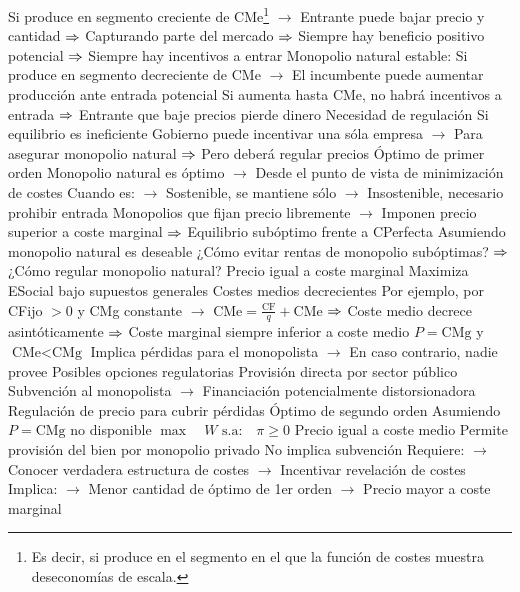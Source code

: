 \documentclass{nuevotema}
\begin{document}
\begin{esquemal}
				\4[] Si produce en segmento creciente de CMe\footnote{Es decir, si produce en el segmento en el que la función de costes muestra deseconomías de escala.}
				\4[] $\to$ Entrante puede bajar precio y cantidad
				\4[] $\Rightarrow$ Capturando parte del mercado
				\4[] $\Rightarrow$ Siempre hay beneficio positivo potencial
				\4[] $\Rightarrow$ Siempre hay incentivos a entrar
				\4 Monopolio natural estable:
				\4[] Si produce en segmento decreciente de CMe
				\4[] $\to$ El incumbente puede aumentar producción ante entrada potencial
				\4[] Si aumenta hasta CMe, no habrá incentivos a entrada
				\4[] $\Rightarrow$ Entrante que baje precios pierde dinero
				\4 Necesidad de regulación
				\4[] Si equilibrio es ineficiente
				\4[] Gobierno puede incentivar una sóla empresa
				\4[] $\to$ Para asegurar monopolio natural
				\4[] $\Rightarrow$ Pero deberá regular precios
			\3 Óptimo de primer orden
				\4 Monopolio natural es óptimo
				\4[] $\to$ Desde el punto de vista de minimización de costes
				\4[] Cuando es:
				\4[] $\to$ Sostenible, se mantiene sólo
				\4[] $\to$ Insostenible, necesario prohibir entrada
				\4 Monopolios que fijan precio libremente
				\4[] $\to$ Imponen precio superior a coste marginal
				\4[] $\Rightarrow$ Equilibrio subóptimo frente a CPerfecta
				\4 Asumiendo monopolio natural es deseable
				\4[] ¿Cómo evitar rentas de monopolio subóptimas?
				\4[] $\Rightarrow$ ¿Cómo regular monopolio natural?
				\4 Precio igual a coste marginal
				\4[] Maximiza ESocial bajo supuestos generales
				\4 Costes medios decrecientes
				\4[] Por ejemplo, por CFijo $>0$ y CMg constante
				\4[] $\to$ $\text{CMe} = \frac{\text{CF}}{q} + \text{CMe}$
				\4[] $\Rightarrow$ Coste medio decrece asintóticamente
				\4[] $\Rightarrow$ Coste marginal siempre inferior a coste medio
				\4 $P=\text{CMg}$ y $\text{CMe} < \text{CMg}$
				\4[] Implica pérdidas para el monopolista
				\4[] $\to$ En caso contrario, nadie provee
				\4 Posibles opciones regulatorias
				\4[] Provisión directa por sector público
				\4[] Subvención al monopolista
				\4[] $\to$ Financiación potencialmente distorsionadora
				\4[] Regulación de precio para cubrir pérdidas
			\3 Óptimo de segundo orden
				\4 Asumiendo $P=\text{CMg}$ no disponible
				\4[] $\max \quad W$
				\4[] $\text{s.a:} \quad \pi \geq 0$
				\4 Precio igual a coste medio
				\4[] Permite provisión del bien por monopolio privado
				\4[] No implica subvención
				\4[] Requiere:
				\4[] $\to$ Conocer verdadera estructura de costes
				\4[] $\to$ Incentivar revelación de costes
				\4[] Implica:
				\4[] $\to$ Menor cantidad de óptimo de 1er orden
				\4[] $\to$ Precio mayor a coste marginal

\end{esquemal}
\end{document}
